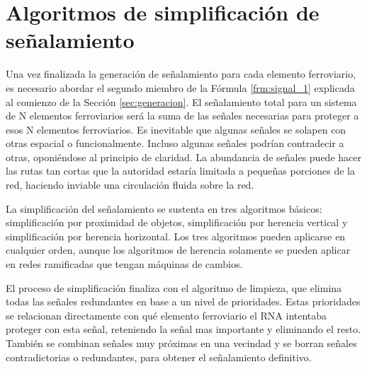 \section{Algoritmos de simplificación de señalamiento}
    \label{sec:simplificacion}

    
    Una vez finalizada la generación de señalamiento para cada elemento ferroviario, es necesario abordar el segundo miembro de la Fórmula \ref{frm:signal_1} explicada al comienzo de la Sección \ref{sec:generacion}. El señalamiento total para un sistema de N elementos ferroviarios será la suma de las señales necesarias para proteger a esos N elementos ferroviarios. Es inevitable que algunas señales se solapen con otras espacial o funcionalmente. Incluso algunas señales podrían contradecir a otras, oponiéndose al principio de claridad. La abundancia de señales puede hacer las rutas tan cortas que la autoridad estaría limitada a pequeñas porciones de la red, haciendo inviable una circulación fluida sobre la red.

    La simplificación del señalamiento se sustenta en tres algoritmos básicos: simplificación por proximidad de objetos, simplificación por herencia vertical y simplificación por herencia horizontal. Los tres algoritmos pueden aplicarse en cualquier orden, aunque los algoritmos de herencia solamente se pueden aplicar en redes ramificadas que tengan máquinas de cambios. 

    El proceso de simplificación finaliza con el algoritmo de limpieza, que elimina todas las señales redundantes en base a un nivel de prioridades. Estas prioridades se relacionan directamente con qué elemento ferroviario el RNA intentaba proteger con esta señal, reteniendo la señal mas importante y eliminando el resto. También se combinan señales muy próximas en una vecindad y se borran señales contradictorias o redundantes, para obtener el señalamiento definitivo.    

    
    
    
    